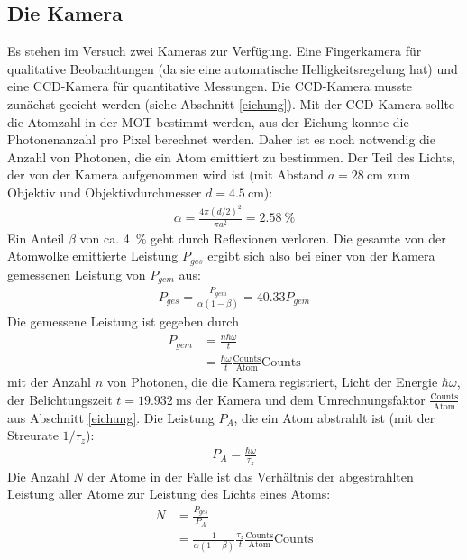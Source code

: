 \documentclass[12pt, a4paper]{article}
\begin{document}
  \subsection{Die Kamera}
    Es stehen im Versuch zwei Kameras zur Verfügung. Eine Fingerkamera für qualitative
    Beobachtungen (da sie eine automatische Helligkeitsregelung hat) und eine
    CCD-Kamera für quantitative Messungen. Die CCD-Kamera musste zunächst geeicht
    werden (siehe Abschnitt \ref{eichung}). Mit der CCD-Kamera sollte die Atomzahl in
    der MOT bestimmt werden, aus der Eichung konnte die Photonenanzahl pro Pixel
    berechnet werden. Daher ist es noch notwendig die Anzahl von Photonen, die ein Atom
    emittiert zu bestimmen. Der Teil des Lichts, der von der Kamera aufgenommen wird
    ist (mit Abstand $a = \SI{28}{\cm}$ zum Objektiv und Objektivdurchmesser $d =
    \SI{4.5}{\cm}$):
    \begin{align*}
      \alpha = \frac{4 \pi (d / 2)^2}{\pi a^2} = \SI{2.58}{\percent}
    \end{align*}
    Ein Anteil $\beta$ von ca. \SI{4}{\percent} geht durch Reflexionen verloren. Die
    gesamte von der Atomwolke emittierte Leistung $P_{ges}$ ergibt sich also bei einer
    von der Kamera gemessenen Leistung von $P_{gem}$ aus:
    \begin{align*}
      P_{ges} = \frac{P_{gem}}{\alpha (1 - \beta)} = 40.33 P_{gem}
    \end{align*}
    Die gemessene Leistung ist gegeben durch
    \begin{align*}
      P_{gem} &= \frac{n \hbar \omega}{t} \\
      &= \frac{\hbar \omega}{t} \frac{\text{Counts}}{\text{Atom}} \text{Counts}
    \end{align*}
    mit der Anzahl $n$ von Photonen, die die Kamera registriert, Licht der Energie
    $\hbar \omega$, der Belichtungszeit $t = \SI{19.932}{\ms}$ der Kamera und dem
    Umrechnungsfaktor $\frac{\text{Counts}}{\text{Atom}}$ aus Abschnitt \ref{eichung}.
    Die Leistung $P_A$, die ein Atom abstrahlt ist (mit der Streurate $1 / \tau_z$):
    \begin{align*}
      P_A = \frac{\hbar \omega}{\tau_z}
    \end{align*}
    Die Anzahl $N$ der Atome in der Falle ist das Verhältnis der abgestrahlten Leistung
    aller Atome zur Leistung des Lichts eines Atoms:
    \begin{align*}
      N &= \frac{P_{ges}}{P_A} \\
      &= \frac{1}{\alpha (1 - \beta)} \frac{\tau_z}{t}
        \frac{\text{Counts}}{\text{Atom}} \text{Counts}
    \end{align*}
\end{document}
